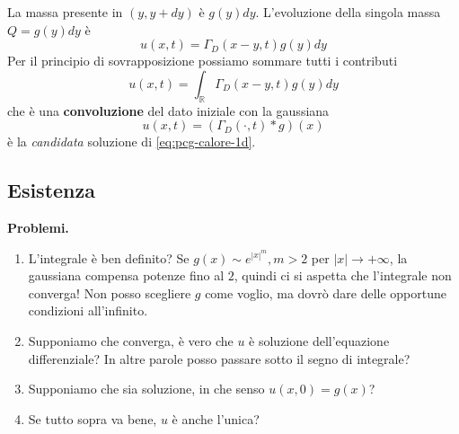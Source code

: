 \documentclass[10pt,a4paper,twoside,openright]{book}
\begin{document}
La massa presente in $(y,y+dy)$ è $g(y) dy$. L'evoluzione della singola massa $Q=g(y) dy$ è
\begin{equation*}
u(x,t) =\Gamma _{D}(x-y,t) g(y) dy
\end{equation*}
Per il principio di sovrapposizione possiamo sommare tutti i contributi
\begin{equation*}
u(x,t) =\int _{\mathbb{R}} \Gamma _{D}(x-y,t) g(y) dy
\end{equation*}
che è una \textbf{convoluzione} del dato iniziale con la gaussiana
\begin{equation*}
u(x,t) =( \Gamma _{D}(\cdotp,t) *g)(x)
\end{equation*}
è la \textit{candidata} soluzione di \eqref{eq:pcg-calore-1d}.
\subsection{Esistenza}

\textbf{Problemi.}
\begin{enumerate}
\item L'integrale è ben definito? Se $g(x) \sim e^{|x|^m},m >2$ per $| x| \rightarrow +\infty $, la gaussiana compensa potenze fino al $2$, quindi ci si aspetta che l'integrale non converga! Non posso scegliere $g$ come voglio, ma dovrò dare delle opportune condizioni all'infinito.
\item Supponiamo che converga, è vero che $u$ è soluzione dell'equazione differenziale? In altre parole posso passare sotto il segno di integrale?
\item Supponiamo che sia soluzione, in che senso $u(x,0) =g(x)$?
\item Se tutto sopra va bene, $u$ è anche l'unica?
\end{enumerate}
\end{document}
